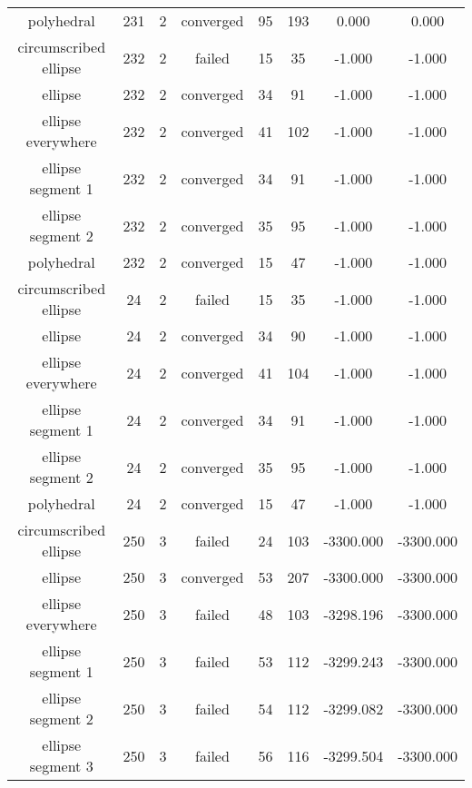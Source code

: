 \begin{footnotesize}
\begin{center}
\begin{longtable}{ c c c c c c c c }
        polyhedral        &  231  &  2  & converged  &   95  &  193  &   0.000    &   0.000    \\
  circumscribed ellipse   &  232  &  2  &   failed   &   15  &   35  &   -1.000   &   -1.000   \\
         ellipse          &  232  &  2  & converged  &   34  &   91  &   -1.000   &   -1.000   \\
    ellipse everywhere    &  232  &  2  & converged  &   41  &  102  &   -1.000   &   -1.000   \\
    ellipse segment 1     &  232  &  2  & converged  &   34  &   91  &   -1.000   &   -1.000   \\
    ellipse segment 2     &  232  &  2  & converged  &   35  &   95  &   -1.000   &   -1.000   \\
        polyhedral        &  232  &  2  & converged  &   15  &   47  &   -1.000   &   -1.000   \\
  circumscribed ellipse   &   24  &  2  &   failed   &   15  &   35  &   -1.000   &   -1.000   \\
         ellipse          &   24  &  2  & converged  &   34  &   90  &   -1.000   &   -1.000   \\
    ellipse everywhere    &   24  &  2  & converged  &   41  &  104  &   -1.000   &   -1.000   \\
    ellipse segment 1     &   24  &  2  & converged  &   34  &   91  &   -1.000   &   -1.000   \\
    ellipse segment 2     &   24  &  2  & converged  &   35  &   95  &   -1.000   &   -1.000   \\
        polyhedral        &   24  &  2  & converged  &   15  &   47  &   -1.000   &   -1.000   \\
  circumscribed ellipse   &  250  &  3  &   failed   &   24  &  103  & -3300.000  & -3300.000  \\
         ellipse          &  250  &  3  & converged  &   53  &  207  & -3300.000  & -3300.000  \\
    ellipse everywhere    &  250  &  3  &   failed   &   48  &  103  & -3298.196  & -3300.000  \\
    ellipse segment 1     &  250  &  3  &   failed   &   53  &  112  & -3299.243  & -3300.000  \\
    ellipse segment 2     &  250  &  3  &   failed   &   54  &  112  & -3299.082  & -3300.000  \\
    ellipse segment 3     &  250  &  3  &   failed   &   56  &  116  & -3299.504  & -3300.000  \\

\end{longtable}
\end{center}
\end{footnotesize}
